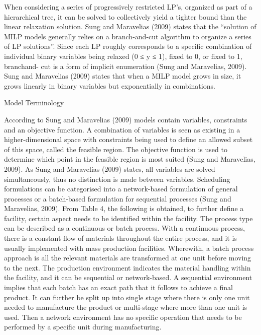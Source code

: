 \documentclass[a4paper,11pt,fleqn]{report}
\begin{document}
                When considering a series of progressively restricted LP’s, organized as part of a hierarchical tree, it can be solved to collectively yield a tighter bound than the linear relaxation solution. Sung and Maravelias (2009) states that the “solution of MILP models generally relies on a branch-and-cut algorithm to organize a series of LP solutions”. Since each LP roughly corresponds to a specific combination of individual binary variables being relaxed (0 ≤ y ≤ 1), fixed to 0, or fixed to 1, branchand- cut is a form of implicit enumeration (Sung and Maravelias, 2009). Sung and Maravelias (2009) states that when a MILP model grows in size, it grows linearly in binary variables but exponentially in combinations.
                
            Model Terminology
            
                According to Sung and Maravelias (2009) models contain variables, constraints and an objective function. A combination of variables is seen as existing in a higher-dimensional space with constraints being used to define an allowed subset of this space, called the feasible region. The objective function is used to determine which point in the feasible region is most suited (Sung and Maravelias, 2009). As Sung and Maravelias (2009) states, all variables are solved simultaneously, thus no distinction is made between variables. 
                Scheduling formulations can be categorised into a network-based formulation of general processes or a batch-based formulation for sequential processes (Sung and Maravelias, 2009).
                From Table 4, the following is obtained, to further define a facility, certain aspect needs to be identified within the facility. The process type can be described as a continuous or batch process. With a continuous process, there is a constant flow of materials throughout the entire process, and it is usually implemented with mass production facilities. Wherewith, a batch process approach is all the relevant materials are transformed at one unit before moving to the next. The production environment indicates the material handling within the facility, and it can be sequential or network-based. A sequential environment implies that each batch has an exact path that it follows to achieve a final product. It can further be split up into single stage where there is only one unit needed to manufacture the product or multi-stage where more than one unit is used. Then a network environment has no specific operation that needs to be performed by a specific unit during manufacturing.
                
\end{document}

